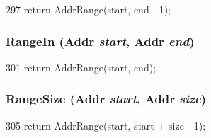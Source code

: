 \begin{DoxyCode}
297 { return AddrRange(start, end - 1); }
\end{DoxyCode}
\hypertarget{addr__range_8hh_a5c98bada80d8aa7845117af0eba98dc5}{
\subsubsection[{RangeIn}]{ RangeIn ({\bf Addr} {\em start}, \/  {\bf Addr} {\em end})}}
\label{addr__range_8hh_a5c98bada80d8aa7845117af0eba98dc5}



\begin{DoxyCode}
301 { return AddrRange(start, end); }
\end{DoxyCode}
\hypertarget{addr__range_8hh_a59cd089c5b2fbc6eecd8507757432740}{
\subsubsection[{RangeSize}]{ RangeSize ({\bf Addr} {\em start}, \/  {\bf Addr} {\em size})}}
\label{addr__range_8hh_a59cd089c5b2fbc6eecd8507757432740}



\begin{DoxyCode}
305 { return AddrRange(start, start + size - 1); }
\end{DoxyCode}
